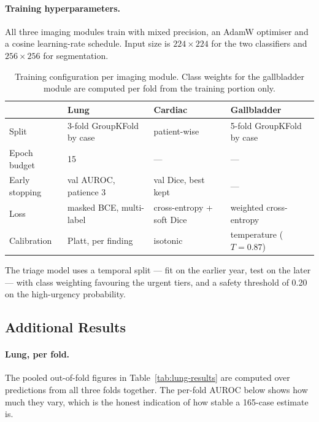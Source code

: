 \paragraph{Training hyperparameters.} All three imaging modules train with mixed precision, an
AdamW optimiser and a cosine learning-rate schedule. Input size is $224\times224$ for the two
classifiers and $256\times256$ for segmentation.

\begin{table}[H]
  \centering
  \small
  \begin{tabular}{@{}llll@{}}
    \toprule
    & Lung & Cardiac & Gallbladder \\
    \midrule
    Split & 3-fold GroupKFold by case & patient-wise & 5-fold GroupKFold by case \\
    Epoch budget & 15 & --- & --- \\
    Early stopping & val AUROC, patience 3 & val Dice, best kept & --- \\
    Loss & masked BCE, multi-label & cross-entropy + soft Dice & weighted cross-entropy \\
    Calibration & Platt, per finding & isotonic & temperature ($T=0.87$) \\
    \bottomrule
  \end{tabular}
  \caption{Training configuration per imaging module. Class weights for the gallbladder module
    are computed per fold from the training portion only.}
  \label{tab:app-hyper}
\end{table}

The triage model uses a temporal split --- fit on the earlier year, test on the later --- with
class weighting favouring the urgent tiers, and a safety threshold of 0.20 on the high-urgency
probability.

\subsection{Additional Results}
\label{app:results}

\paragraph{Lung, per fold.} The pooled out-of-fold figures in Table~\ref{tab:lung-results} are
computed over predictions from all three folds together. The per-fold AUROC below shows how
much they vary, which is the honest indication of how stable a 165-case estimate is.

